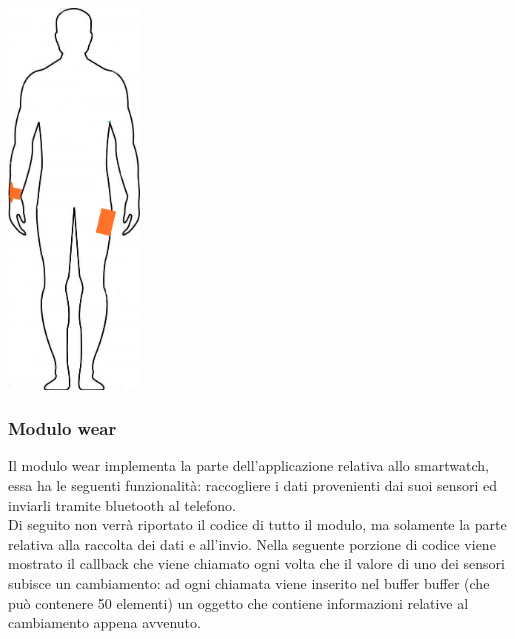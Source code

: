 \documentclass[a4paper]{article}
\begin{document}
\makebox[\linewidth]{}
\begin{minipage}{\linewidth}
\begin{center}
\includegraphics[width=35mm]{./images/sagoma_phone_watch.jpg} 
\makebox[\linewidth]{}
\end{center}
\end{minipage}
\makebox[\linewidth]{}
\makebox[\linewidth]{}


\subsubsection{Modulo wear}
Il modulo wear implementa la parte dell’applicazione relativa allo smartwatch, essa ha le seguenti funzionalità: raccogliere i dati provenienti dai suoi sensori ed inviarli tramite bluetooth al telefono.\\
Di seguito non verrà riportato il codice di tutto il modulo, ma solamente la parte relativa alla raccolta dei dati e all’invio.
Nella seguente porzione di codice viene mostrato il callback che viene chiamato ogni volta che il valore di uno dei sensori subisce un cambiamento: ad ogni chiamata viene inserito nel buffer buffer (che può contenere 50 elementi) un oggetto che contiene informazioni relative al cambiamento appena avvenuto.
\makebox[\linewidth]{}
\makebox[\linewidth]{}



\end{document}
